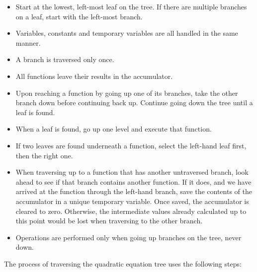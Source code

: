 \documentclass[refcap, oxford]{ahsan}
\begin{document}
\begin{itemize}
  \item Start at the lowest, left-most leaf on the tree. If there are multiple branches on a leaf, start with the left-most branch.
  \item Variables, constants and temporary variables are all handled in the same manner.
  \item A branch is traversed only once.
  \item All functions leave their results in the accumulator.
  \item Upon reaching a function by going up one of its branches, take the other branch down before continuing back up. Continue going down the tree until a leaf is found.
  \item When a leaf is found, go up one level and execute that function.
  \item If two leaves are found underneath a function, select the left-hand leaf first, then the right one.
  \item When traversing up to a function that has another untraversed branch, look ahead to see if that branch contains another function. If it does, and we have arrived at the function through the left-hand branch, save the contents of the accumulator in a unique temporary variable. Once saved, the accumulator is cleared to zero. Otherwise, the intermediate values already calculated up to this point would be lost when traversing to the other branch.
  \item Operations are performed only when going up branches on the tree, never down.
\end{itemize}

The process of traversing the quadratic equation tree uses the following steps:
\end{document}
